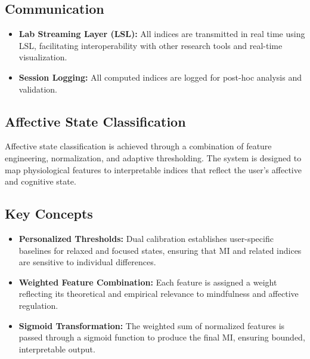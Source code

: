 \subsection*{Communication}
\begin{itemize}
    \item \textbf{Lab Streaming Layer (LSL):} All indices are transmitted in real time using LSL, facilitating interoperability with other research tools and real-time visualization.
    \item \textbf{Session Logging:} All computed indices are logged for post-hoc analysis and validation.
\end{itemize}

\subsection{Affective State Classification}
\label{sec:affective_classification}

Affective state classification is achieved through a combination of feature engineering, normalization, and adaptive thresholding. The system is designed to map physiological features to interpretable indices that reflect the user’s affective and cognitive state.

\subsection*{Key Concepts}
\begin{itemize}
    \item \textbf{Personalized Thresholds:} Dual calibration establishes user-specific baselines for relaxed and focused states, ensuring that MI and related indices are sensitive to individual differences.
    \item \textbf{Weighted Feature Combination:} Each feature is assigned a weight reflecting its theoretical and empirical relevance to mindfulness and affective regulation.
    \item \textbf{Sigmoid Transformation:} The weighted sum of normalized features is passed through a sigmoid function to produce the final MI, ensuring bounded, interpretable output.
\end{itemize}

